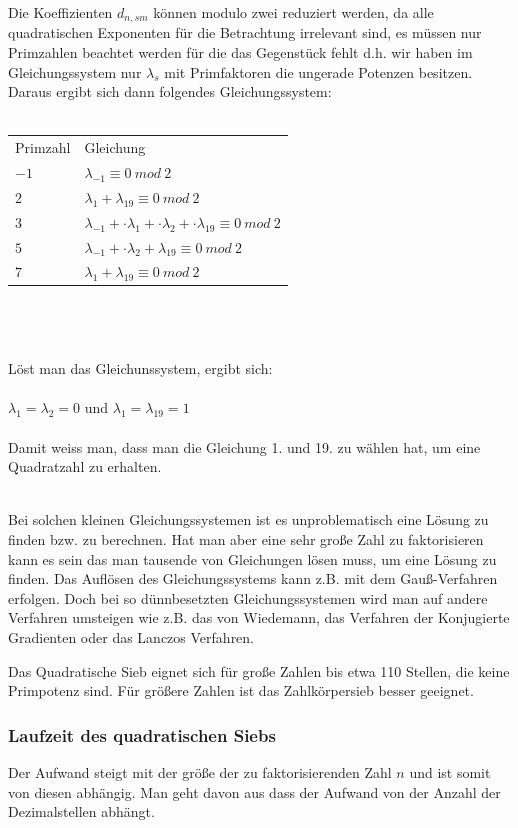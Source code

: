 \documentclass[a4paper,11pt]{article}
\begin{document}
Die Koeffizienten $d_{n,sm}$ können modulo zwei reduziert
werden, da alle quadratischen Exponenten für die Betrachtung
irrelevant sind, es müssen nur Primzahlen beachtet
werden für die das Gegenstück fehlt d.h. wir haben
im Gleichungssystem nur $\lambda_s$ mit Primfaktoren
die ungerade Potenzen besitzen. Daraus ergibt
sich dann folgendes Gleichungssystem:\\\\
{\it
\begin{tabular}{ll}
Primzahl & Gleichung\\
$-1$ & $ \lambda_{-1} \equiv 0\ mod\ 2  $\\
$2$ & $\lambda_{1} + \lambda_{19} \equiv 0\ mod\ 2  $\\
$3$ & $\lambda_{-1} + \cdot \lambda_{1} + \cdot \lambda_{2} +  \cdot \lambda_{19} \equiv 0\ mod\ 2  $\\
$5$ & $ \lambda_{-1} + \cdot \lambda_{2} + \lambda_{19} \equiv 0\ mod\ 2  $\\
$7$ & $\lambda_{1} + \lambda_{19} \equiv 0\ mod\ 2  $\\
\end{tabular}\\\\\\
Löst man das Gleichunssystem, ergibt sich:\\\\
$\lambda_1 = \lambda_2 = 0 $ und $\lambda_1 = \lambda_{19} = 1 $\\\\
Damit weiss man, dass man die Gleichung 1. und 19. zu wählen hat, um eine Quadratzahl zu erhalten.\\\\
}

Bei solchen kleinen Gleichungssystemen ist es unproblematisch eine
Lösung zu finden bzw. zu berechnen. Hat man aber eine sehr
große Zahl zu faktorisieren kann es sein das man tausende
von Gleichungen lösen muss, um eine Lösung zu finden. Das
Auflösen des Gleichungssystems kann z.B. mit dem Gauß-Verfahren
erfolgen. Doch bei so dünnbesetzten Gleichungssystemen wird
man auf andere Verfahren umsteigen wie z.B. das von Wiedemann,
das Verfahren der Konjugierte Gradienten oder das Lanczos Verfahren.

Das Quadratische Sieb eignet sich für große Zahlen bis etwa
110 Stellen, die keine Primpotenz sind. Für größere Zahlen ist
das Zahlkörpersieb besser geeignet.

\subsubsection*{Laufzeit des quadratischen Siebs}
Der Aufwand steigt mit der größe der zu faktorisierenden Zahl
$n$ und ist somit von diesen abhängig. Man geht davon aus dass
der Aufwand von der Anzahl der Dezimalstellen abhängt.
\end{document}
